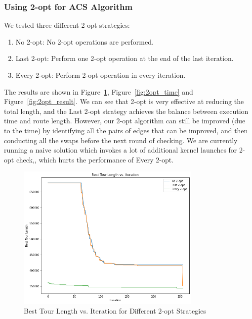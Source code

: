 \documentclass{article}
\begin{document}
\subsubsection{Using 2-opt for ACS Algorithm}
We tested three different 2-opt strategies:
\begin{enumerate}
    \item No 2-opt: No 2-opt operations are performed.
    \item Last 2-opt: Perform one 2-opt operation at the end of the last iteration.
    \item Every 2-opt: Perform 2-opt operation in every iteration.
\end{enumerate}
The results are shown in Figure~\ref{fig:2opt_conv}, Figure~\ref{fig:2opt_time} and Figure~\ref{fig:2opt_result}. We can see that 2-opt is very effective at reducing the total length, and the Last 2-opt strategy achieves the balance between execution time and route length. However, our 2-opt algorithm can still be improved (due to the time) by identifying all the pairs of edges that can be improved, and then conducting all the swaps before the next round of checking. We are currently running a naive solution which invokes a lot of additional kernel launches for 2-opt check,, which hurts the performance of Every 2-opt.
\begin{figure}
    \centering
    \includegraphics[width=0.8\textwidth]{2opt_conv.png}
    \caption{Best Tour Length vs. Iteration for Different 2-opt Strategies}
    \label{fig:2opt_conv}
\end{figure}
\end{document}
